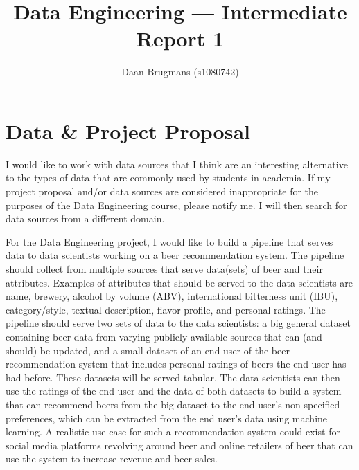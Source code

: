 \documentclass[sigconf, natbib=true]{acmart}
\begin{document}
\title{Data Engineering --- Intermediate Report 1}

\author{Daan Brugmans (s1080742)}

\maketitle

\section{Data \& Project Proposal}
I would like to work with data sources that I think are an interesting alternative to the types of data that are commonly used by students in academia.
If my project proposal and/or data sources are considered inappropriate for the purposes of the Data Engineering course, please notify me. 
I will then search for data sources from a different domain.

For the Data Engineering project, I would like to build a pipeline that serves data to data scientists working on a beer recommendation system.
The pipeline should collect from multiple sources that serve data(sets) of beer and their attributes.
Examples of attributes that should be served to the data scientists are name, brewery, alcohol by volume (ABV), international bitterness unit (IBU), category/style, textual description, flavor profile, and personal ratings.
The pipeline should serve two sets of data to the data scientists: a big general dataset containing beer data from varying publicly available sources that can (and should) be updated, and a small dataset of an end user of the beer recommendation system that includes personal ratings of beers the end user has had before.
These datasets will be served tabular.
The data scientists can then use the ratings of the end user and the data of both datasets to build a system that can recommend beers from the big dataset to the end user's non-specified preferences, which can be extracted from the end user's data using machine learning.
A realistic use case for such a recommendation system could exist for social media platforms revolving around beer and online retailers of beer that can use the system to increase revenue and beer sales.
\end{document}
